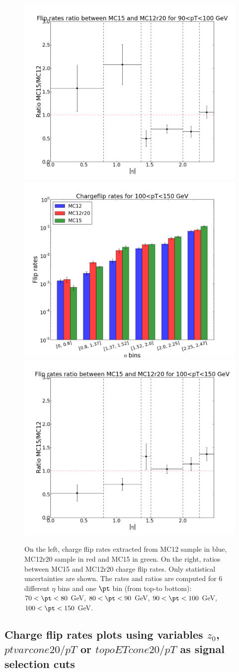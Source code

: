 \begin{figure}[!htbp]
\includegraphics[width=0.33\linewidth]{FIGURES/BKG/chargeFlip/APPENDIX/ratio_MC15vsMC12r20/ratio_plot_90.png}
\vfill
\includegraphics[width=0.33\linewidth]{FIGURES/BKG/chargeFlip/APPENDIX/fliprates_MC12r20/fliprates_3samples_100.png}
\includegraphics[width=0.33\linewidth]{FIGURES/BKG/chargeFlip/APPENDIX/ratio_MC15vsMC12r20/ratio_plot_100.png}
\caption{\label{fig:12r20vs15_7080} On the left, charge flip rates extracted from MC12 sample in blue, MC12r20 sample in red and MC15 in green. On the right, ratios between MC15 and MC12r20 charge flip rates. Only statistical uncertainties are shown. 
The rates and ratios are computed for 6 different $\eta$ bins and one $\pt$ bin (from top-to bottom): $70<\pt<80$ GeV, $80<\pt<90$ GeV, $90<\pt<100$ GeV, $100<\pt<150$ GeV.}
\end{figure}


\FloatBarrier

\subsection{Charge flip rates plots using variables $z_0$, $ptvarcone20/pT$ or $topoETcone20/pT$ as signal selection cuts}
\label{app:CFrates3}

